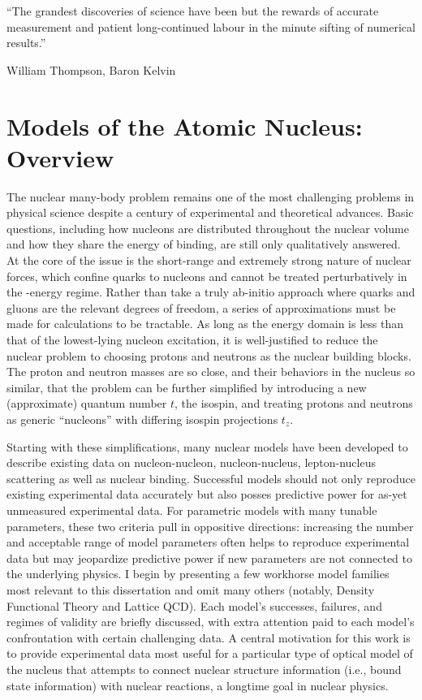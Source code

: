 \epigraph{``The grandest discoveries of science have been but the rewards of
    accurate measurement and patient long-continued labour in the minute
sifting of numerical results.''}{William Thompson,  Baron Kelvin}
\section{Models of the Atomic Nucleus: Overview}
The nuclear many-body problem remains one of the most challenging problems in
physical science despite a century of experimental and theoretical advances.
Basic questions, including how nucleons are distributed throughout the nuclear
volume and how they share the energy of binding, are still only qualitatively
answered. At the core of the issue is the short-range and extremely strong
nature of nuclear forces, which confine
quarks to nucleons and cannot be treated perturbatively in the \mega\electronvolt-energy regime.
Rather than take a truly ab-initio approach where quarks and gluons
are the relevant degrees of freedom, a series of approximations must be made
for calculations to be tractable. As long as the energy domain is less than that
of the lowest-lying nucleon excitation, it is well-justified to reduce the
nuclear problem to choosing protons and neutrons as the nuclear building blocks.
The proton and neutron masses are so close, and their behaviors in the nucleus so similar,
that the problem can be further simplified by introducing a new (approximate) quantum number
$t$, the isospin, and treating protons and neutrons as generic ``nucleons'' with differing isospin
projections $t_{z}$.

Starting with these simplifications, many nuclear models have been developed to describe existing 
data on nucleon-nucleon, nucleon-nucleus, lepton-nucleus scattering as well as
nuclear binding. Successful models should not only reproduce existing
experimental data accurately but also posses predictive power for as-yet unmeasured
experimental data. For parametric models
with many tunable parameters, these two criteria pull in oppositive directions:
increasing the number
and acceptable range of model parameters often helps to reproduce experimental data but may
jeopardize predictive power if new parameters are not connected to the underlying physics.
I begin by presenting a few workhorse model families most relevant
to this dissertation and omit many others (notably, Density Functional Theory
and Lattice QCD). Each model's successes,
failures, and regimes of validity are briefly discussed, with extra attention paid
to each model's confrontation with certain challenging data.
A central motivation for this work is to provide experimental data most useful
for a particular type of optical model of the nucleus that attempts to
connect nuclear structure information (i.e., bound state information) with nuclear
reactions, a longtime goal in nuclear physics. 
